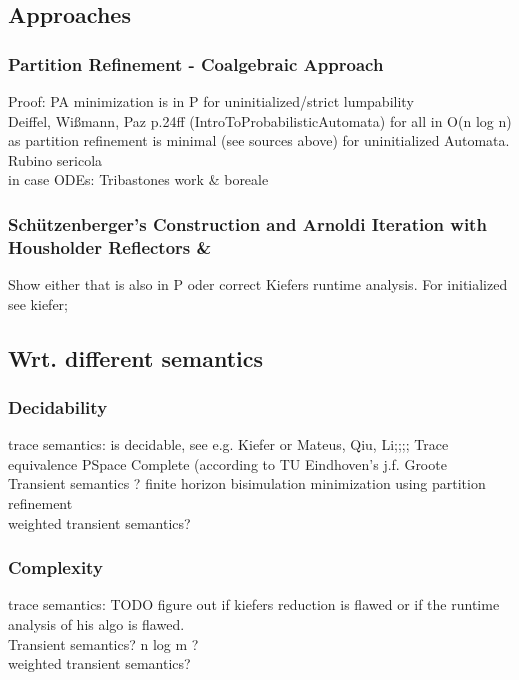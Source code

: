         \subsection{Approaches}
            \subsubsection{Partition Refinement - Coalgebraic Approach}
            Proof: PA minimization is in P for uninitialized/strict lumpability \\
            Deiffel, Wißmann, Paz p.24ff (IntroToProbabilisticAutomata)
            for all in O(n log n) as partition refinement is minimal (see sources above) for uninitialized Automata. \\
            Rubino sericola \\
            in case ODEs: Tribastones work \& boreale
        
            \subsubsection{Schützenberger's Construction and Arnoldi Iteration with Housholder Reflectors \& }
            Show either that is also in P oder correct Kiefers runtime analysis.
            For initialized see kiefer; 
            
        \subsection{Wrt. different semantics}
            \subsubsection{Decidability}
            trace semantics: is decidable, see e.g. Kiefer or Mateus, Qiu, Li;;;; Trace equivalence PSpace Complete (according to TU Eindhoven's j.f. Groote \\
            Transient semantics ? finite horizon bisimulation minimization using partition refinement \\
            weighted transient semantics? \\
            
            \subsubsection{Complexity}
            trace semantics: TODO figure out if kiefers reduction is flawed or if the runtime analysis of his algo is flawed. \\
            Transient semantics? n log m ?\\
            weighted transient semantics? \\
            
    
